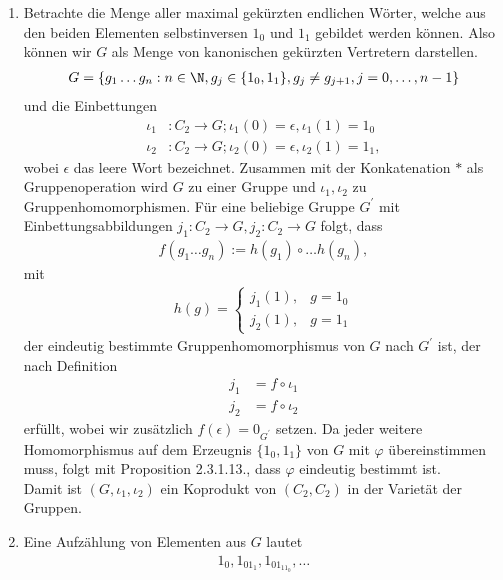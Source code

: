 \begin{solution}
\begin{enumerate}
  \item Betrachte die Menge aller maximal gekürzten endlichen Wörter, welche aus den beiden
  Elementen selbstinversen $1_0$ und $1_1$ gebildet werden können.
  Also können wir $G$ als Menge von kanonischen gekürzten Vertretern darstellen.
  \begin{align*}
  G = \{g_1\dots g_n: n \in \N, g_j \in\{1_0,1_1\}, g_j \neq g_{j+1}, j = 0,\dots,n-1\}
  \end{align*}
  und die Einbettungen
  \begin{align*}
    \iota_1&: C_2 \to G; \iota_1(0) = \epsilon, \iota_1(1) = 1_0 \\
    \iota_2&: C_2 \to G; \iota_2(0) = \epsilon, \iota_2(1) = 1_1,
  \end{align*}
  wobei $\epsilon$ das leere Wort bezeichnet.
  Zusammen mit der Konkatenation $*$ als Gruppenoperation wird $G$ zu einer Gruppe
  und $\iota_1,\iota_2$ zu Gruppenhomomorphismen.
  Für eine beliebige Gruppe $G^{\prime}$ mit Einbettungsabbildungen $j_1: C_2 \to G,
  j_2: C_2 \to G$ folgt, dass
  \begin{align*}
    f(g_1\dots g_n) := h(g_1)\circ\dots h(g_n),
  \end{align*}
  mit
  \begin{align*}
    h(g) = \begin{cases}
      j_1(1), & g = 1_0 \\
      j_2(1), & g = 1_1
    \end{cases}
  \end{align*}
  der eindeutig bestimmte Gruppenhomomorphismus von $G$ nach $G^{\prime}$
  ist, der nach Definition
  \begin{align*}
    j_1 &= f \circ \iota_1 \\
    j_2 &= f \circ \iota_2
  \end{align*}
  erfüllt, wobei wir zusätzlich $f(\epsilon) = 0_{G^\prime}$ setzen.
  Da jeder weitere Homomorphismus auf dem Erzeugnis $\{1_0,1_1\}$ von $G$
  mit $\varphi$ übereinstimmen muss, folgt mit Proposition 2.3.1.13., dass
  $\varphi$ eindeutig bestimmt ist. \\
  Damit ist $(G,\iota_1,\iota_2)$ ein Koprodukt von $(C_2,C_2)$ in der Varietät
  der Gruppen.
  \item Eine Aufzählung von Elementen aus $G$ lautet
  \begin{align*}
    1_0,1_01_1,1_01_11_0,\dots
  \end{align*}

\end{enumerate}
\end{solution}
